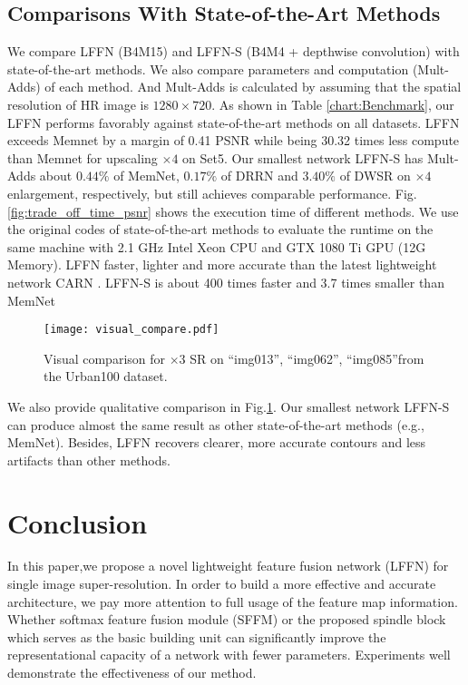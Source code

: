 \documentclass[journal]{IEEEtran}
\begin{document}
\subsection{Comparisons With State-of-the-Art Methods}

We compare LFFN (B4M15) and LFFN-S (B4M4 + depthwise convolution) with state-of-the-art methods. We also compare parameters and computation (Mult-Adds) of each method. And Mult-Adds is calculated by assuming that the spatial resolution of HR image is $1280 \times 720$. As shown in Table \ref{chart:Benchmark}, our LFFN performs favorably against state-of-the-art methods on all datasets. LFFN exceeds Memnet\cite{tai2017memnet} by a margin of 0.41 PSNR while being 30.32 times less compute than Memnet for upscaling $\times 4$ on Set5. Our smallest network LFFN-S has Mult-Adds about $0.44 \%$ of MemNet, $0.17 \%$ of DRRN and $3.40 \%$ of DWSR on $\times 4$ enlargement, respectively, but still achieves comparable performance. Fig.\ref{fig:trade_off_time_psnr} shows the execution time of different methods. We use the original codes of state-of-the-art methods to evaluate the runtime on the same machine with 2.1 GHz Intel Xeon CPU and GTX 1080 Ti GPU (12G Memory). LFFN faster, lighter and more accurate than the latest lightweight network CARN \cite{ahn2018fast}. LFFN-S is about 400 times faster and 3.7 times smaller than MemNet

\begin{figure}[t]
\centering
\texttt{[image: visual\_compare.pdf]}
\caption{Visual comparison for $\times 3$ SR on  ``img013'', ``img062'', ``img085''from the Urban100 dataset.}
\label{visual_compare}
\end{figure}

\par We also provide qualitative comparison in Fig.\ref{visual_compare}. Our smallest network LFFN-S can produce almost the same result as other state-of-the-art methods (e.g., MemNet). Besides, LFFN recovers clearer, more accurate contours and less artifacts than other methods. 

\section{Conclusion}
In this paper,we propose a novel lightweight feature fusion network (LFFN) for single image super-resolution. In order to build a more effective and accurate architecture, we pay more attention to full usage of the feature map information. Whether softmax feature fusion module (SFFM) or the proposed spindle block which serves as the basic building unit can significantly improve the representational capacity of a network with fewer parameters. Experiments well demonstrate the effectiveness of our method.
\end{document}
